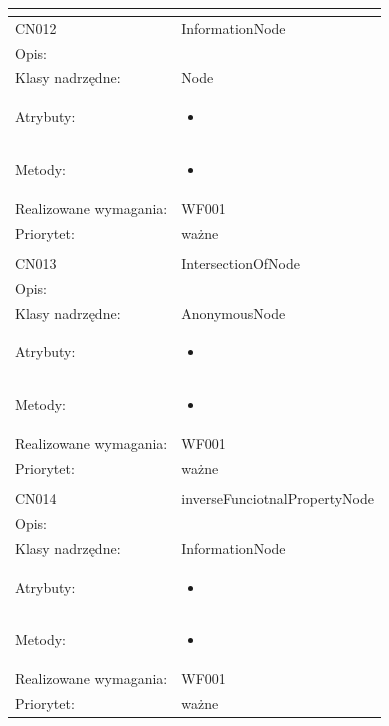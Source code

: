 \documentclass[a4paper,10pt]{article}
\begin{document}
\begin{center}
\begin{longtable}{|m{3cm}|m{9cm}|}
\multicolumn{2}{c}{} \\
 \hline

CN012 & InformationNode \\ \hline
Opis: &     \\ \hline
Klasy nadrzędne: & Node     \\ \hline
Atrybuty: & \begin{itemize}
 \item 
\end{itemize}
 \\ \hline
Metody: & \begin{itemize}
 \item 
\end{itemize}
  \\ \hline
Realizowane wymagania: & WF001 \\ \hline
Priorytet: & ważne  \\ \hline

\multicolumn{2}{c}{} \\
 \hline

CN013 & IntersectionOfNode \\ \hline
Opis: &     \\ \hline
Klasy nadrzędne: & AnonymousNode     \\ \hline
Atrybuty: & \begin{itemize}
 \item 
\end{itemize}
 \\ \hline
Metody: & \begin{itemize}
 \item 
\end{itemize}
  \\ \hline
Realizowane wymagania: & WF001 \\ \hline
Priorytet: & ważne  \\ \hline

\multicolumn{2}{c}{} \\
 \hline

CN014 & inverseFunciotnalPropertyNode \\ \hline
Opis: &     \\ \hline
Klasy nadrzędne: & InformationNode     \\ \hline
Atrybuty: & \begin{itemize}
 \item 
\end{itemize}
 \\ \hline
Metody: & \begin{itemize}
 \item 
\end{itemize}
  \\ \hline
Realizowane wymagania: & WF001 \\ \hline
Priorytet: & ważne  \\ \hline


\end{longtable}
\end{center}
\end{document}
